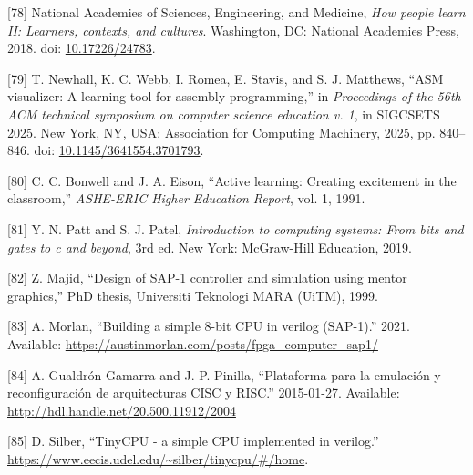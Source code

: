 \documentclass[12pt,oneside]{templates/unerthesis}
\newcommand{\CSLLeftMargin}[1]{#1} %
\newcommand{\CSLRightInline}[1]{#1} %
\newlength{\cslhangindent}
\newenvironment{CSLReferences}[2] %
 {\setlength{\parindent}{0pt}%
  \setlength{\leftskip}{#1 pt\relax}%
  \setlength{\parskip}{#2 pt\relax}%
  \everypar{\setlength{\hangindent}{\cslhangindent}}}
 {\par}
\begin{document}
\begin{CSLReferences}{0}{0}
\leavevmode{}%
\CSLLeftMargin{{[}78{]} }%
\CSLRightInline{National Academies of Sciences, Engineering, and Medicine, \emph{How people learn II: Learners, contexts, and cultures}. Washington, DC: National Academies Press, 2018. doi: \href{https://doi.org/10.17226/24783}{10.17226/24783}.}

\leavevmode{}%
\CSLLeftMargin{{[}79{]} }%
\CSLRightInline{T. Newhall, K. C. Webb, I. Romea, E. Stavis, and S. J. Matthews, {``ASM visualizer: A learning tool for assembly programming,''} in \emph{Proceedings of the 56th ACM technical symposium on computer science education v. 1}, in SIGCSETS 2025. New York, NY, USA: Association for Computing Machinery, 2025, pp. 840--846. doi: \href{https://doi.org/10.1145/3641554.3701793}{10.1145/3641554.3701793}.}

\leavevmode{}%
\CSLLeftMargin{{[}80{]} }%
\CSLRightInline{C. C. Bonwell and J. A. Eison, {``Active learning: Creating excitement in the classroom,''} \emph{ASHE-ERIC Higher Education Report}, vol. 1, 1991.}

\leavevmode{}%
\CSLLeftMargin{{[}81{]} }%
\CSLRightInline{Y. N. Patt and S. J. Patel, \emph{Introduction to computing systems: From bits and gates to c and beyond}, 3rd ed. New York: McGraw-Hill Education, 2019.}

\leavevmode{}%
\CSLLeftMargin{{[}82{]} }%
\CSLRightInline{Z. Majid, {``Design of SAP-1 controller and simulation using mentor graphics,''} PhD thesis, Universiti Teknologi MARA (UiTM), 1999.}

\leavevmode{}%
\CSLLeftMargin{{[}83{]} }%
\CSLRightInline{A. Morlan, {``Building a simple 8-bit CPU in verilog (SAP-1).''} 2021. Available: \url{https://austinmorlan.com/posts/fpga_computer_sap1/}}

\leavevmode{}%
\CSLLeftMargin{{[}84{]} }%
\CSLRightInline{A. Gualdrón Gamarra and J. P. Pinilla, {``Plataforma para la emulación y reconfiguración de arquitecturas CISC y RISC.''} 2015-01-27. Available: \url{http://hdl.handle.net/20.500.11912/2004}}

\leavevmode{}%
\CSLLeftMargin{{[}85{]} }%
\CSLRightInline{D. Silber, {``TinyCPU - a simple CPU implemented in verilog.''} \url{https://www.eecis.udel.edu/~silber/tinycpu/\#/home}.}


\end{CSLReferences}
\end{document}
